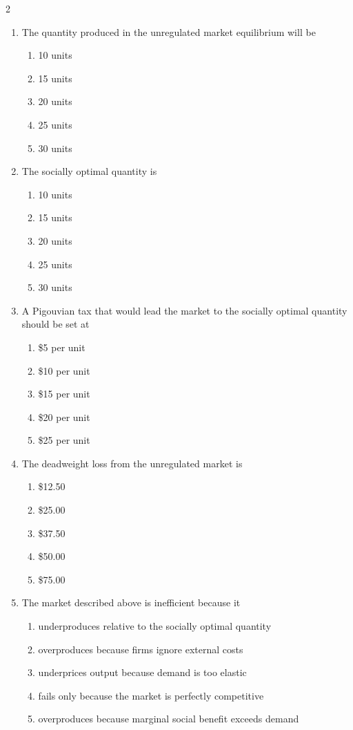 \documentclass[10pt]{article}
\newenvironment{choiceslist}
  {\begin{enumerate}[label=(\Alph*), leftmargin=1.6em, itemsep=0.12em, topsep=0.18em, parsep=0pt]}
  {\end{enumerate}}
\begin{document}
\begin{multicols*}{2}
\begin{enumerate}[resume*=apq, leftmargin=*, itemsep=0.85em, topsep=0.2em, parsep=0pt]
\item The quantity produced in the unregulated market equilibrium will be
\begin{choiceslist}
\item 10 units
\item 15 units
\item 20 units
\item 25 units
\item 30 units
\end{choiceslist}
\item The socially optimal quantity is
\begin{choiceslist}
\item 10 units
\item 15 units
\item 20 units
\item 25 units
\item 30 units
\end{choiceslist}
\item A Pigouvian tax that would lead the market to the socially optimal quantity should be set at
\begin{choiceslist}
\item \$5 per unit
\item \$10 per unit
\item \$15 per unit
\item \$20 per unit
\item \$25 per unit
\end{choiceslist}
\item The deadweight loss from the unregulated market is
\begin{choiceslist}
\item \$12.50
\item \$25.00
\item \$37.50
\item \$50.00
\item \$75.00
\end{choiceslist}
\item The market described above is inefficient because it
\begin{choiceslist}
\item underproduces relative to the socially optimal quantity
\item overproduces because firms ignore external costs
\item underprices output because demand is too elastic
\item fails only because the market is perfectly competitive
\item overproduces because marginal social benefit exceeds demand

\end{choiceslist}
\end{enumerate}
\end{multicols*}
\end{document}
